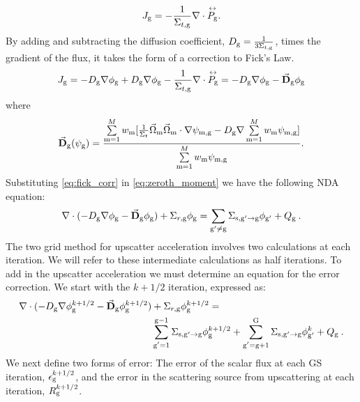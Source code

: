   \begin{equation}
  J_{\mathrm{g}} = -\frac{1}{\Sigma_{t, \mathrm{g}}} \nabla \cdot \overset{\text{\scriptsize$\leftrightarrow$}}{P_{\mathrm{g}}}. 
  \end{equation}
  By adding and subtracting the diffusion coefficient, $D_{\mathrm{g}} = \frac{1}{3\Sigma_{t, \mathrm{g}}}$, times the gradient of the flux, it takes the form of a correction to Fick's Law. 
  \begin{equation}
  J_{\mathrm{g}} = -D_{\mathrm{g}} \nabla \phi_{\mathrm{g}} + D_{\mathrm{g}} \nabla \phi_{\mathrm{g}} - \frac{1}{\Sigma_{t, \mathrm{g}}} \nabla \cdot \overset{\text{\scriptsize$\leftrightarrow$}}{P_{\mathrm{g}}} \\
  = -D_{\mathrm{g}} \nabla \phi_{\mathrm{g}} - \vec{\textbf{D}}_{\mathrm{g}} \phi_{\mathrm{g}}
  \label{eq:fick_corr}
  \end{equation}
  where 
 \begin{equation}
  \vec{\textbf{D}}_{\mathrm{g}} (\psi_{\mathrm{g}}) = \frac{\sum\limits_{\mathrm{m}=1}^M w_{\mathrm{m}} [\frac{1}{\Sigma_t} \vec{\Omega}_{\mathrm{m}} \vec{\Omega}_{\mathrm{m}} \cdot \nabla\psi_{\mathrm{m}, \mathrm{g}} - D_{\mathrm{g}} \nabla \sum\limits_{\mathrm{m}=1}^M w_{\mathrm{m}}\psi_{\mathrm{m}, \mathrm{g}}]}{\sum\limits_{\mathrm{m}=1}^M w_{\mathrm{m}} \psi_{\mathrm{m}, \mathrm{g}}}.
  \end{equation} 
 Substituting \eqref{eq:fick_corr} in \eqref{eq:zeroth_moment} we have the following NDA equation:
  \begin{equation}
  \nabla\cdot(-D_{\mathrm{g}} \nabla \phi_{\mathrm{g}} - \vec{\bf D}_{\mathrm{g}} \phi_{\mathrm{g}}) + \Sigma_{r,\mathrm{g}} \phi_{\mathrm{g}} = \sum\limits_{{\mathrm{g}'}\neq\mathrm{g}}\Sigma_{\mathrm{s},\mathrm{g}' \rightarrow \mathrm{g}}\phi_{\mathrm{g}'} + Q_{\mathrm{g}} \:. \label{eq:NDA}
  \end{equation}
  The two grid method for upscatter acceleration involves two calculations at each iteration. We will refer to these intermediate calculations as half iterations. To add in the upscatter acceleration we must determine an equation for the error correction. We start with the $k + 1/2$ iteration, expressed as:
  \begin{equation}
  \begin{split}
  \nabla\cdot(-D_{\mathrm{g}} \nabla \phi_{\mathrm{g}}^{k+1/2} - \vec{\bf D}_{\mathrm{g}} \phi_{\mathrm{g}}^{k+1/2}) &+ \Sigma_{r,\mathrm{g}} \phi_{\mathrm{g}}^{k+1/2} =  \\ &\sum\limits_{\substack{\mathrm{g}'=1}}^{\mathrm{g-1}} \Sigma_{\mathrm{s},\mathrm{g}' \to\mathrm{g}}\phi_{\mathrm{g}}^{k+1/2} + \sum\limits_{\substack{\mathrm{g}'=\mathrm{g}+1}}^{\mathrm{G}} \Sigma_{\mathrm{s},\mathrm{g}' \to\mathrm{g}}\phi_{\mathrm{g}'}^{k} + Q_{\mathrm{g}}\:. 
  \end{split}
  \label{eq:k1/2}
  \end{equation}
  We next define two forms of error: The error of the scalar flux at each GS iteration, $\epsilon_{\mathrm{g}}^{k+1/2}$, and the error in the scattering source from upscattering at each iteration, $R_{\mathrm{g}}^{k+1/2}$.
